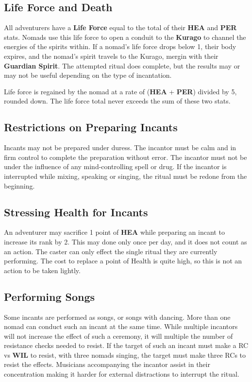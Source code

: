 \begin{multicols*}{2}
\subsection{Life Force and Death}
All adventurers have a \textbf{Life Force} equal to the total of their \textbf{HEA} and \textbf{PER} stats. Nomads use this life force to open a conduit to the \textbf{Kurago} to channel the energies of the spirits within. If a nomad's life force drops below 1, their body expires, and the nomad's spirit travels to the Kurago, mergin with their \textbf{Guardian Spirit}. The attempted ritual does complete, but the results may or may not be useful depending on the type of incantation.

Life force is regained by the nomad at a rate of (\textbf{HEA} + \textbf{PER}) divided by 5, rounded down. The life force total never exceeds the sum of these two stats.
\subsection{Restrictions on Preparing Incants}
Incants may not be prepared under duress. The incantor must be calm and in firm control to complete the preparation without error. The incantor must not be under the influence of any mind-controlling spell or drug. If the incantor is interrupted while mixing, speaking or singing, the ritual must be redone from the beginning.
\subsection{Stressing Health for Incants}
An adventurer may sacrifice 1 point of \textbf{HEA} while preparing an incant to increase its rank by 2. This may done only once per day, and it does not count as an action. The caster can only effect the single ritual they are currently performing. The cost to replace a point of Health is quite high, so this is not an action to be taken lightly.
\subsection{Performing Songs}
Some incants are performed as songs, or songs with dancing. More than one nomad can conduct such an incant at the same time. While multiple incantors will not increase the effect of such a ceremony, it will multiple the number of resistance checks needed to resist. If the target of such an incant must make a  RC vs \textbf{WIL} to resist, with three nomads singing, the target must make three RCs to resist the effects. Musicians accompanying the incantor assist in their concentration making it harder for external distractions to interrupt the ritual.

\end{multicols*}
